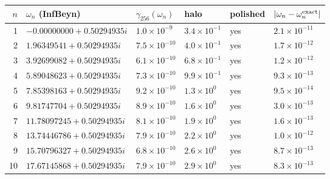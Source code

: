 \begin{tabular}{rlllll}
\toprule
$n$ & $\omega_n$ (InfBeyn) & $\gamma_{256}(\omega_n)$ & halo & polished & $|\omega_n-\omega_n^{\rm exact}|$\\
\midrule
1 & $-0.00000000+0.50294935i$ & $1.0\times10^{-9}$ & $3.4\times10^{-1}$ & yes & $2.1\times10^{-11}$\\
2 & $1.96349541+0.50294935i$ & $7.5\times10^{-10}$ & $4.0\times10^{-1}$ & yes & $1.7\times10^{-12}$\\
3 & $3.92699082+0.50294935i$ & $6.1\times10^{-10}$ & $6.8\times10^{-1}$ & yes & $1.2\times10^{-12}$\\
4 & $5.89048623+0.50294935i$ & $7.3\times10^{-10}$ & $9.9\times10^{-1}$ & yes & $9.3\times10^{-13}$\\
5 & $7.85398163+0.50294935i$ & $9.2\times10^{-10}$ & $1.3\times10^{0}$ & yes & $9.5\times10^{-14}$\\
6 & $9.81747704+0.50294935i$ & $8.9\times10^{-10}$ & $1.6\times10^{0}$ & yes & $3.0\times10^{-13}$\\
7 & $11.78097245+0.50294935i$ & $8.1\times10^{-10}$ & $1.9\times10^{0}$ & yes & $1.6\times10^{-13}$\\
8 & $13.74446786+0.50294935i$ & $7.9\times10^{-10}$ & $2.2\times10^{0}$ & yes & $1.0\times10^{-12}$\\
9 & $15.70796327+0.50294935i$ & $6.8\times10^{-10}$ & $2.6\times10^{0}$ & yes & $8.7\times10^{-13}$\\
10 & $17.67145868+0.50294935i$ & $7.9\times10^{-10}$ & $2.9\times10^{0}$ & yes & $8.3\times10^{-13}$\\
\bottomrule
\end{tabular}
